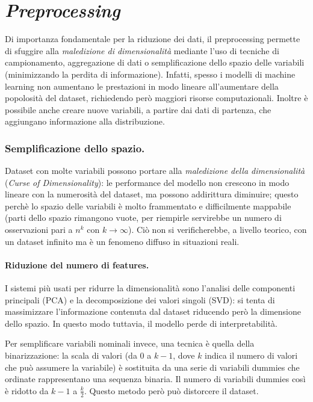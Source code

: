 \documentclass[11pt, a4page, twocolumn]{article}
\begin{document}
\newpage
\part{\textit{Preprocessing}}
Di importanza fondamentale per la riduzione dei dati, il preprocessing permette di sfuggire alla \textit{maledizione di dimensionalità} mediante l'uso di tecniche di campionamento, aggregazione di dati o semplificazione dello spazio delle variabili (minimizzando la perdita di informazione).
Infatti, spesso i modelli di machine learning non aumentano le prestazioni in modo lineare all'aumentare della popolosità del dataset, richiedendo però maggiori risorse computazionali.
Inoltre è possibile anche creare nuove variabili, a partire dai dati di partenza, che aggiungano informazione alla distribuzione.


\section{Semplificazione dello spazio.}
Dataset con molte variabili possono portare alla \textit{maledizione della dimensionalità} (\textit{Curse of Dimensionality}): le performance del modello non crescono in modo lineare con la numerosità del dataset, ma possono addirittura diminuire; questo perchè lo spazio delle variabili è molto frammentato e difficilmente mappabile (parti dello spazio rimangono vuote, per riempirle servirebbe un numero di osservazioni pari a $n^k$ con $k \to \infty$).
Ciò non si verificherebbe, a livello teorico, con un dataset infinito ma è un fenomeno diffuso in situazioni reali.

\subsection{Riduzione del numero di features.}
I sistemi più usati per ridurre la dimensionalità sono l'analisi delle componenti principali (PCA) e la decomposizione dei valori singoli (SVD): si tenta di massimizzare l'informazione contenuta dal dataset riducendo però la dimensione dello spazio.
In questo modo tuttavia, il modello perde di interpretabilità.

Per semplificare variabili nominali invece, una tecnica è quella della binarizzazione: la scala di valori (da $0$ a $k-1$, dove $k$ indica il numero di valori che può assumere la variabile) è sostituita da una serie di variabili dummies che ordinate rappresentano una sequenza binaria.
Il numero di variabili dummies così è ridotto da $k-1$ a $\frac{k}{2}$.
Questo metodo però può distorcere il dataset.
\end{document}
